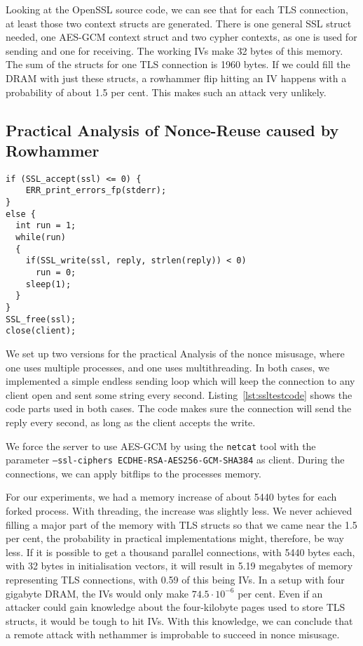 Looking at the OpenSSL source code, we can see that for each TLS connection, at
least those two context structs are generated. There is one general SSL struct
needed, one AES-GCM context struct and two cypher contexts, as one is used for
sending and one for receiving. The working IVs make 32 bytes of this memory. The
sum of the structs for one TLS connection is 1960 bytes. If we could fill the
DRAM with just these structs, a rowhammer flip hitting an IV happens with a
probability of about 1.5 per cent. This makes such an attack very unlikely.

\subsection{Practical Analysis of Nonce-Reuse caused by Rowhammer}

\begin{minipage}{\linewidth}
\begin{lstlisting}[style=CStyle,
                   caption={},
                   label={lst:ssltestcode}]
if (SSL_accept(ssl) <= 0) {
    ERR_print_errors_fp(stderr);
}
else {
  int run = 1;
  while(run)
  {
    if(SSL_write(ssl, reply, strlen(reply)) < 0)
      run = 0;
    sleep(1);
  }
}
SSL_free(ssl);
close(client);
\end{lstlisting}
\end{minipage}

We set up two versions for the practical Analysis of the nonce misusage, where
one uses multiple processes, and one uses multithreading. In both cases, we
implemented a simple endless sending loop which will keep the connection to any
client open and sent some string every second. Listing~\ref{lst:ssltestcode}
shows the code parts used in both cases. The code makes sure the connection will
send the reply every second, as long as the client accepts the write.

We force the server to use AES-GCM by using the \texttt{netcat} tool with the
parameter \texttt{--ssl-ciphers ECDHE-RSA-AES256-GCM-SHA384} as client.
During the connections, we can apply bitflips to the processes memory.

For our experiments, we had a memory increase of about 5440 bytes for each
forked process. With threading, the increase was slightly less. We never
achieved filling a major part of the memory with TLS structs so that we came
near the 1.5 per cent, the probability in practical implementations might,
therefore, be way less. If it is possible to get a thousand parallel
connections, with 5440 bytes each, with 32 bytes in initialisation vectors, it
will result in 5.19 megabytes of memory representing TLS connections, with 0.59%
of this being IVs. In a setup with four gigabyte DRAM, the IVs would only make
$74.5\cdot10^{-6}$ per cent. Even if an attacker could gain knowledge about the
four-kilobyte pages used to store TLS structs, it would be tough to hit IVs.
With this knowledge, we can conclude that a remote attack with nethammer is
improbable to succeed in nonce misusage.

